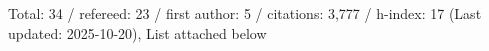 Total: 34 / refereed: 23 / first author: 5 / citations: 3,777 / h-index: 17 (Last updated: 2025-10-20), List attached below